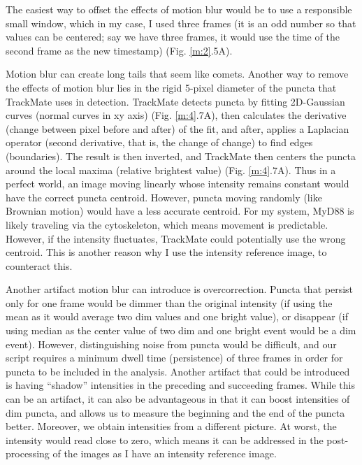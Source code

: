 The easiest way to offset the effects of motion blur would be to use a responsible small window, which in my case, I used three frames (it is an odd number so that values can be centered; say we have three frames, it would use the time of the second frame as the new timestamp) (Fig. \ref{m:2}.5A).

Motion blur can create long tails that seem like comets. Another way to remove the effects of motion blur lies in the rigid 5-pixel diameter of the puncta that TrackMate uses in detection. TrackMate detects puncta by fitting 2D-Gaussian curves (normal curves in xy axis) (Fig. \ref{m:4}.7A), then calculates the derivative (change between pixel before and after) of the fit, and after, applies a Laplacian operator (second derivative, that is, the change of change) to find edges (boundaries). The result is then inverted, and TrackMate then centers the puncta around the local maxima (relative brightest value) (Fig. \ref{m:4}.7A). Thus in a perfect world, an image moving linearly whose intensity remains constant would have the correct puncta centroid. However, puncta moving randomly (like Brownian motion) would have a less accurate centroid. For my system, MyD88 is likely traveling via the cytoskeleton, which means movement is predictable. However, if the intensity fluctuates, TrackMate could potentially use the wrong centroid. This is another reason why I use the intensity reference image, to counteract this.

Another artifact motion blur can introduce is overcorrection. Puncta that persist only for one frame would be dimmer than the original intensity (if using the mean as it would average two dim values and one bright value), or disappear (if using median as the center value of two dim and one bright event would be a dim event). However, distinguishing noise from puncta would be difficult, and our script requires a minimum dwell time (persistence) of three frames in order for puncta to be included in the analysis. Another artifact that could be introduced is having “shadow” intensities in the preceding and succeeding frames. While this can be an artifact, it can also be advantageous in that it can boost intensities of dim puncta, and allows us to measure the beginning and the end of the puncta better. Moreover, we obtain intensities from a different picture. At worst, the intensity would read close to zero, which means it can be addressed in the post-processing of the images as I have an intensity reference image.


